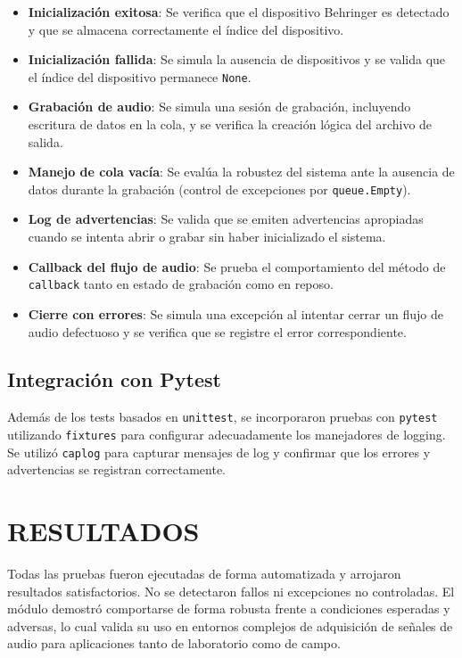 \begin{itemize} \item \textbf{Inicialización exitosa}: Se verifica que el dispositivo Behringer es detectado y que se almacena correctamente el índice del dispositivo. \item \textbf{Inicialización fallida}: Se simula la ausencia de dispositivos y se valida que el índice del dispositivo permanece \texttt{None}. \item \textbf{Grabación de audio}: Se simula una sesión de grabación, incluyendo escritura de datos en la cola, y se verifica la creación lógica del archivo de salida. \item \textbf{Manejo de cola vacía}: Se evalúa la robustez del sistema ante la ausencia de datos durante la grabación (control de excepciones por \texttt{queue.Empty}). \item \textbf{Log de advertencias}: Se valida que se emiten advertencias apropiadas cuando se intenta abrir o grabar sin haber inicializado el sistema. \item \textbf{Callback del flujo de audio}: Se prueba el comportamiento del método de \texttt{callback} tanto en estado de grabación como en reposo. \item \textbf{Cierre con errores}: Se simula una excepción al intentar cerrar un flujo de audio defectuoso y se verifica que se registre el error correspondiente. \end{itemize}

\subsection{Integración con Pytest}

Además de los tests basados en \texttt{unittest}, se incorporaron pruebas con \texttt{pytest} utilizando \texttt{fixtures} para configurar adecuadamente los manejadores de logging. Se utilizó \texttt{caplog} para capturar mensajes de log y confirmar que los errores y advertencias se registran correctamente.

\section{RESULTADOS}

Todas las pruebas fueron ejecutadas de forma automatizada y arrojaron resultados satisfactorios. No se detectaron fallos ni excepciones no controladas. El módulo demostró comportarse de forma robusta frente a condiciones esperadas y adversas, lo cual valida su uso en entornos complejos de adquisición de señales de audio para aplicaciones tanto de laboratorio como de campo.

